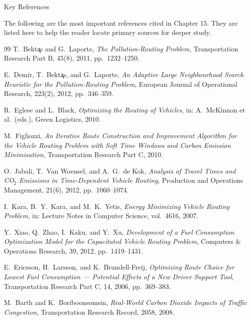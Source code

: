 \documentclass[aspectratio=169,10pt]{beamer}
\begin{document}
\begin{frame}[allowframebreaks]{Key References}

  The following are the most important references cited in Chapter 15.
  They are listed here to help the reader locate primary sources for
  deeper study.

  \begin{thebibliography}{99}
    T.\ Bekt\c{a}s and G.\ Laporte,
    \emph{The Pollution-Routing Problem},
    Transportation Research Part B, 45(8), 2011, pp.\ 1232--1250.

    E.\ Demir, T.\ Bekt\c{a}s, and G.\ Laporte,
    \emph{An Adaptive Large Neighbourhood Search Heuristic for the
    Pollution-Routing Problem},
    European Journal of Operational Research, 223(2), 2012, pp.\ 346--359.

    R.\ Eglese and L.\ Black,
    \emph{Optimizing the Routing of Vehicles},
    in: A.\ McKinnon et al.\ (eds.), Green Logistics, 2010.

    M.\ Figliozzi,
    \emph{An Iterative Route Construction and Improvement Algorithm for the
    Vehicle Routing Problem with Soft Time Windows and Carbon Emission Minimisation},
    Transportation Research Part C, 2010.

    O.\ Jabali, T.\ Van Woensel, and A.\ G.\ de Kok,
    \emph{Analysis of Travel Times and CO$_2$ Emissions in Time-Dependent
    Vehicle Routing},
    Production and Operations Management, 21(6), 2012, pp.\ 1060--1074.

    I.\ Kara, B.\ Y.\ Kara, and M.\ K.\ Yetis,
    \emph{Energy Minimizing Vehicle Routing Problem},
    in: Lecture Notes in Computer Science, vol.\ 4616, 2007.

    Y.\ Xiao, Q.\ Zhao, I.\ Kaku, and Y.\ Xu,
    \emph{Development of a Fuel Consumption Optimization Model for the
    Capacitated Vehicle Routing Problem},
    Computers \& Operations Research, 39, 2012, pp.\ 1419--1431.

    E.\ Ericsson, H.\ Larsson, and K.\ Brundell-Freij,
    \emph{Optimizing Route Choice for Lowest Fuel Consumption --- Potential
    Effects of a New Driver Support Tool},
    Transportation Research Part C, 14, 2006, pp.\ 369--383.

    M.\ Barth and K.\ Boriboonsomsin,
    \emph{Real-World Carbon Dioxide Impacts of Traffic Congestion},
    Transportation Research Record, 2058, 2008.


\end{thebibliography}
\end{frame}
\end{document}
